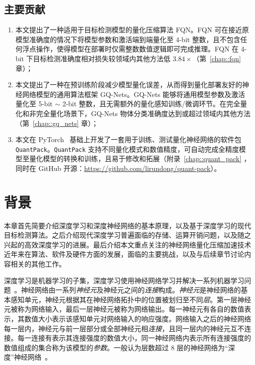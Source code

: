 \documentclass[
  fontset = source,
]{shtthesis}
\begin{document}
\section{主要贡献}
\begin{enumerate}
  \item 本文提出了一种适用于目标检测模型的量化压缩算法 FQN。FQN 可在接近原模型准确度的情况下将模型参数和激活端到端量化至 4-bit 整数，且不包含任何浮点操作，使得模型在部署时仅需整数数值逻辑即可完成推理。FQN 在 4-bit 下目标检测准确度相对损失较领域内其他方法低 $3.84\times$（第~\ref{chap::fqn} 章）；
  \item 本文提出了一种在预训练阶段减少模型量化误差，从而得到量化部署友好的神经网络模型的通用算法框架 GQ-Nets。GQ-Nets 能够将通用模型参数及激活量化至 5-bit $\sim$ 2-bit 整数，且无需额外的量化感知训练/微调环节。在完全量化和非完全量化场景下，GQ-Nets 物体分类准确度达到或超过领域内其他方法（第~\ref{chap::gq_nets} 章）；
  \item 本文在 PyTorch~\citep{paszke2019pytorch} 基础上开发了一套用于训练、测试量化神经网络的软件包 \verb|QuantPack|。\verb|QuantPack| 支持不同量化模式和数值精度，可自动完成全精度模型至量化模型的转换和训练，且易于修改和拓展（附录~\ref{chap::quant_pack} ，同时在 GitHub 开源：\url{https://github.com/lirundong/quant-pack}）。
\end{enumerate}
\chapter{背景} \label{chap::background}
本章首先简要介绍深度学习和深度神经网络的基本原理，以及基于深度学习的现代目标检测算法。之后介绍现代深度学习普遍面临的存储、运算开销问题，以及随之兴起的高效深度学习的进展。最后介绍本文重点关注的神经网络量化压缩加速技术近年来在算法、软件及硬件方面的发展，面临的主要挑战，以及与后续章节讨论内容相关的其他工作。

深度学习是机器学习的子集，深度学习使用神经网络学习并解决一系列机器学习问题~\citep{lecun2015deep}。神经网络由一系列\emph{神经元}及神经元之间的\emph{连接}构成。\emph{神经元}是神经网络的基本感知单元，神经元根据其在神经网络拓扑中的位置被划归至不同\emph{层}。第一层神经元被称为网络输入，最后一层神经元被称为网络输出。每一神经元有各自的数值表示，其数值大小表示该感知单元对网络输入的响应强度。网络输入之后的神经网络每一层内，神经元与前一层部分或全部神经元相\emph{连接}，且同一层内的神经元互不连接。每一连接有表示其连接强度的数值大小，同一神经网络内表示所有连接强度的数值组成的集合称为该模型的\emph{参数}。一般认为层数超过 8 层的神经网络为“深度”神经网络~\citep{krizhevsky2012imagenet}。
\end{document}
